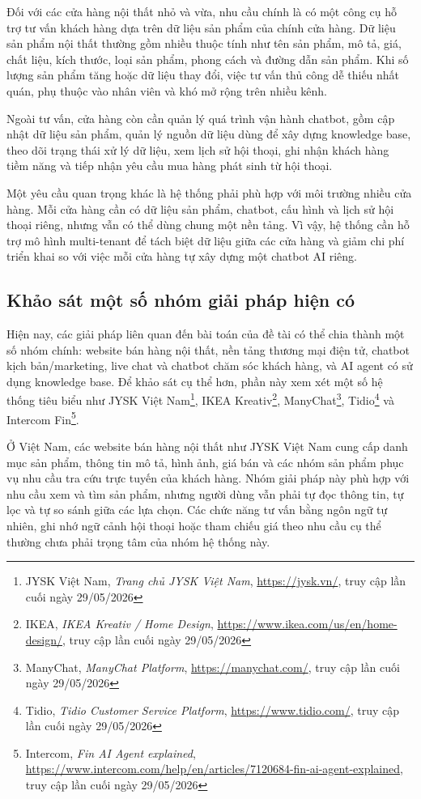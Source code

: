 \documentclass[../DoAn.tex]{subfiles}
\begin{document}
Đối với các cửa hàng nội thất nhỏ và vừa, nhu cầu chính là có một công cụ hỗ trợ tư vấn khách hàng dựa trên dữ liệu sản phẩm của chính cửa hàng. Dữ liệu sản phẩm nội thất thường gồm nhiều thuộc tính như tên sản phẩm, mô tả, giá, chất liệu, kích thước, loại sản phẩm, phong cách và đường dẫn sản phẩm. Khi số lượng sản phẩm tăng hoặc dữ liệu thay đổi, việc tư vấn thủ công dễ thiếu nhất quán, phụ thuộc vào nhân viên và khó mở rộng trên nhiều kênh.

Ngoài tư vấn, cửa hàng còn cần quản lý quá trình vận hành chatbot, gồm cập nhật dữ liệu sản phẩm, quản lý nguồn dữ liệu dùng để xây dựng knowledge base, theo dõi trạng thái xử lý dữ liệu, xem lịch sử hội thoại, ghi nhận khách hàng tiềm năng và tiếp nhận yêu cầu mua hàng phát sinh từ hội thoại.

Một yêu cầu quan trọng khác là hệ thống phải phù hợp với môi trường nhiều cửa hàng. Mỗi cửa hàng cần có dữ liệu sản phẩm, chatbot, cấu hình và lịch sử hội thoại riêng, nhưng vẫn có thể dùng chung một nền tảng. Vì vậy, hệ thống cần hỗ trợ mô hình multi-tenant để tách biệt dữ liệu giữa các cửa hàng và giảm chi phí triển khai so với việc mỗi cửa hàng tự xây dựng một chatbot AI riêng.

\subsection{Khảo sát một số nhóm giải pháp hiện có}
\label{subsection:2.1.3}
Hiện nay, các giải pháp liên quan đến bài toán của đề tài có thể chia thành một số nhóm chính: website bán hàng nội thất, nền tảng thương mại điện tử, chatbot kịch bản/marketing, live chat và chatbot chăm sóc khách hàng, và AI agent có sử dụng knowledge base. Để khảo sát cụ thể hơn, phần này xem xét một số hệ thống tiêu biểu như JYSK Việt Nam\footnote{JYSK Việt Nam, \textit{Trang chủ JYSK Việt Nam}, \url{https://jysk.vn/}, truy cập lần cuối ngày 29/05/2026}, IKEA Kreativ\footnote{IKEA, \textit{IKEA Kreativ / Home Design}, \url{https://www.ikea.com/us/en/home-design/}, truy cập lần cuối ngày 29/05/2026}, ManyChat\footnote{ManyChat, \textit{ManyChat Platform}, \url{https://manychat.com/}, truy cập lần cuối ngày 29/05/2026}, Tidio\footnote{Tidio, \textit{Tidio Customer Service Platform}, \url{https://www.tidio.com/}, truy cập lần cuối ngày 29/05/2026} và Intercom Fin\footnote{Intercom, \textit{Fin AI Agent explained}, \url{https://www.intercom.com/help/en/articles/7120684-fin-ai-agent-explained}, truy cập lần cuối ngày 29/05/2026}.

Ở Việt Nam, các website bán hàng nội thất như JYSK Việt Nam cung cấp danh mục sản phẩm, thông tin mô tả, hình ảnh, giá bán và các nhóm sản phẩm phục vụ nhu cầu tra cứu trực tuyến của khách hàng. Nhóm giải pháp này phù hợp với nhu cầu xem và tìm sản phẩm, nhưng người dùng vẫn phải tự đọc thông tin, tự lọc và tự so sánh giữa các lựa chọn. Các chức năng tư vấn bằng ngôn ngữ tự nhiên, ghi nhớ ngữ cảnh hội thoại hoặc tham chiếu giá theo nhu cầu cụ thể thường chưa phải trọng tâm của nhóm hệ thống này.
\end{document}
